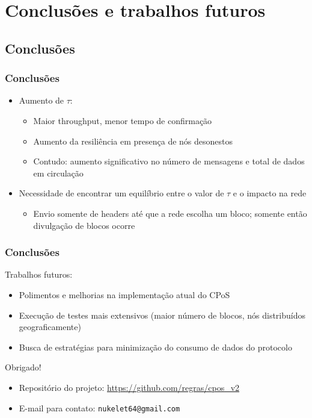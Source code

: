 \documentclass{beamer}
\begin{document}
\section{Conclusões e trabalhos futuros}
\subsection{Conclusões}
\begin{frame}
\frametitle{Conclusões}
\begin{itemize}
    \item Aumento de $\tau$:
    \pause
        \begin{itemize}
            \item<1-> Maior throughput, menor tempo de confirmação
            \item<2-> Aumento da resiliência em presença de nós desonestos
            \item<3-> Contudo: aumento significativo no número de mensagens e total de dados em circulação
        \end{itemize}
    \item<4-> Necessidade de encontrar um equilíbrio entre o valor de $\tau$ e o impacto na rede
        \begin{itemize}
            \item<5-> Envio somente de headers até que a rede escolha um bloco; somente então divulgação de blocos ocorre
        \end{itemize}
\end{itemize}
\end{frame}

\begin{frame}
\frametitle{Conclusões}
Trabalhos futuros:
\begin{itemize}
    \item Polimentos e melhorias na implementação atual do CPoS
    \item Execução de testes mais extensivos (maior número de blocos, nós distribuídos geograficamente)
    \item Busca de estratégias para minimização do consumo de dados do protocolo
\end{itemize}
\end{frame}

\begin{frame}
    Obrigado!
    \begin{itemize}
        \item Repositório do projeto: \url{https://github.com/regras/cpos_v2}
        \item E-mail para contato: \texttt{nukelet64@gmail.com}
    \end{itemize}
\end{frame}
\end{document}
